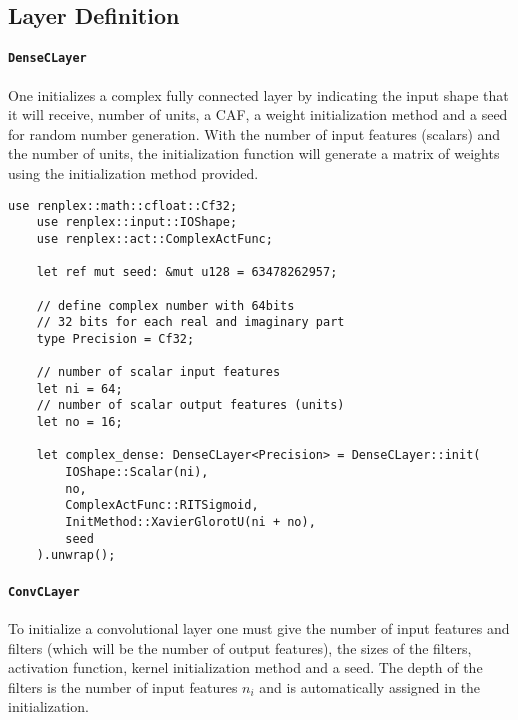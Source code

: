 \subsection{Layer Definition}
\paragraph{\texttt{DenseCLayer}}

One initializes a complex fully connected layer by indicating the input shape that it will receive, number of units, a \gls{CAF}, a weight initialization method and a seed for random number generation. With the number of input features (scalars) and the number of units, the initialization function will generate a matrix of weights using the initialization method provided.

\begin{lstlisting}[caption=Initialization of a complex dense layer.]
	use renplex::math::cfloat::Cf32;
	use renplex::input::IOShape;
	use renplex::act::ComplexActFunc;
	
	let ref mut seed: &mut u128 = 63478262957;
	
	// define complex number with 64bits
	// 32 bits for each real and imaginary part
	type Precision = Cf32;
	
	// number of scalar input features
	let ni = 64;
	// number of scalar output features (units)
	let no = 16;
	
	let complex_dense: DenseCLayer<Precision> = DenseCLayer::init(
		IOShape::Scalar(ni), 
		no,
		ComplexActFunc::RITSigmoid, 
		InitMethod::XavierGlorotU(ni + no),
		seed
	).unwrap();
\end{lstlisting}

\paragraph{\texttt{ConvCLayer}}

To initialize a convolutional layer one must give the number of input features and filters (which will be the number of output features), the sizes of the filters, activation function, kernel initialization method and a seed.  The depth of the filters is the number of input features $ n_i $ and is automatically assigned in the initialization.

